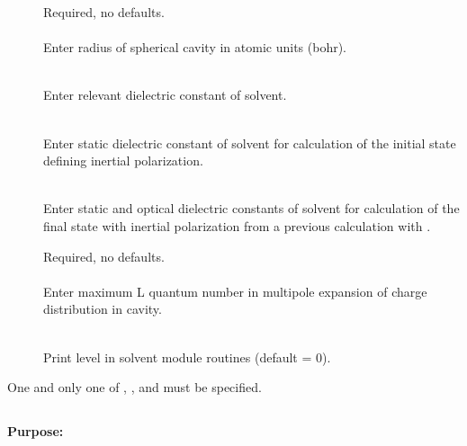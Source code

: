 \begin{description}
\item[]
  Required, no defaults.\\
  \\
  Enter radius of spherical cavity in atomic units (bohr).

\item[]
  \\
  Enter relevant dielectric constant of solvent.

\item[]
  \\
  Enter static dielectric constant of solvent for calculation
  of the initial state defining inertial polarization. 

\item[]
  \\
  Enter static and optical dielectric constants of solvent
  for calculation of the final state with inertial polarization
  from a previous calculation with . 

\item[]
  Required, no defaults.\\
  \\
  Enter maximum L quantum number in multipole expansion of charge
  distribution in cavity.

\item[]
   \\
  Print level in solvent module routines (default = 0).
\end{description}
 

One and only one of , , and
 must be specified.
\fi %
 
 
 
\pagebreak[3]
\subsection{\label{ref-stpinp}}
 
{\bf Purpose:}
 

